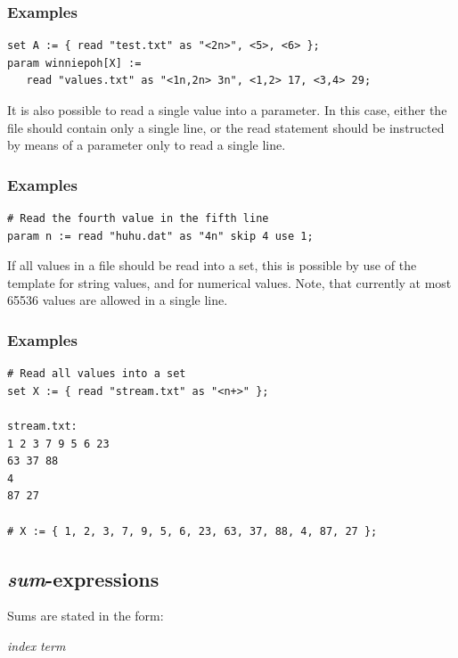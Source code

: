\subsubsection{Examples}
{\small
\begin{verbatim}
set A := { read "test.txt" as "<2n>", <5>, <6> };
param winniepoh[X] :=
   read "values.txt" as "<1n,2n> 3n", <1,2> 17, <3,4> 29;
\end{verbatim}
}

It is also possible to read a single value into a parameter. In this
case, either the file should contain only a single line, or the read
statement should be instructed by means of a  parameter
only to read a single line.

\subsubsection{Examples}
{\small
\begin{verbatim}
# Read the fourth value in the fifth line
param n := read "huhu.dat" as "4n" skip 4 use 1;
\end{verbatim}
}

If all values in a file should be read into a set, this is possible by
use of the  template for string values, and 
for numerical values. Note, that currently at most 65536 values are allowed in a
single line.


\subsubsection{Examples}
{\small
\begin{verbatim}
# Read all values into a set
set X := { read "stream.txt" as "<n+>" };

stream.txt:
1 2 3 7 9 5 6 23
63 37 88
4
87 27

# X := { 1, 2, 3, 7, 9, 5, 6, 23, 63, 37, 88, 4, 87, 27 };
\end{verbatim}
}

\subsection{\emph{sum}-expressions }
Sums are stated in the form:

\smallskip
{} \emph{index}  \emph{term}

